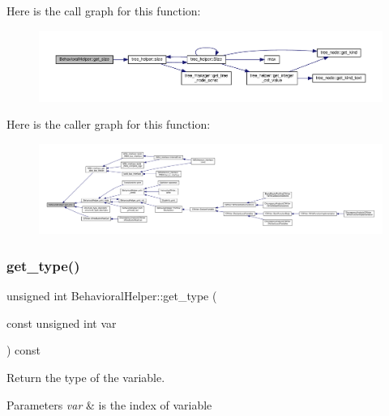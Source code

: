 Here is the call graph for this function\+:
\nopagebreak
\begin{figure}[H]
\begin{center}
\leavevmode
\includegraphics[width=350pt]{dd/db2/classBehavioralHelper_a9106c1fa2b8bab1952a56c53b3e616a0_cgraph}
\end{center}
\end{figure}
Here is the caller graph for this function\+:
\nopagebreak
\begin{figure}[H]
\begin{center}
\leavevmode
\includegraphics[width=350pt]{dd/db2/classBehavioralHelper_a9106c1fa2b8bab1952a56c53b3e616a0_icgraph}
\end{center}
\end{figure}
\mbox{\label{classBehavioralHelper_a00e1217fcbbe785c40ed9aa289fbe4df}} 
\subsubsection{\texorpdfstring{get\+\_\+type()}{get\_type()}}
{\footnotesize\ttfamily unsigned int Behavioral\+Helper\+::get\+\_\+type (\begin{DoxyParamCaption}\item[{const unsigned int}]{var }\end{DoxyParamCaption}) const\hspace{0.3cm}{\ttfamily [virtual]}}



Return the type of the variable. 


\begin{DoxyParams}{Parameters}
{\em var} & is the index of variable \\
\hline
\end{DoxyParams}



